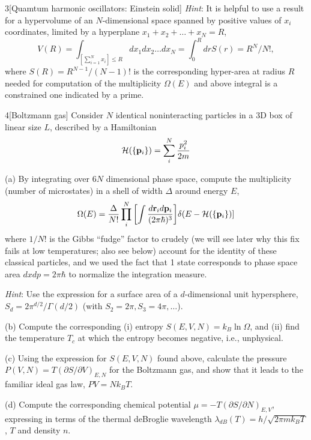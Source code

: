 \documentclass[12pt]{article}
\begin{document}
\begin{problem}{3}[Quamtum harmonic oscillators: Einstein solid]
\textit{Hint}: It is helpful to use a result for a hypervolume of an
$N$-dimensional space spanned by positive values of $x_i$ coordinates, limited
by a hyperplane $x_1+x_2+\hdots+x_N=R$,
\begin{equation}
    V(R)=\int_{[\sum_{i=1}^Nx_i]\leq R}dx_1dx_2\hdots
    dx_N=\int_0^RdrS(r)=R^N/N!,
\end{equation}
where $S(R)=R^{N-1}/(N-1)!$ is the corresponding hyper-area at radius $R$ needed
for computation of the multiplicity $\Omega(E)$ and above integral is a
constrained one indicated by a prime.
\begin{solution}
\end{solution}
\end{problem}
\begin{problem}{4}[Boltzmann gas]
Consider $N$ identical noninteracting particles in a 3D box of linear size $L$,
described by a Hamiltonian
\begin{equation}
    \mathcal{H}(\qty{\vb{p}_i})=\sum_i^N\frac{p_i^2}{2m}
\end{equation}

(a) By integrating over $6N$ dimensional phase space, compute the multiplicity
(number of microstates) in a shell of width $\Delta$ around energy $E$,
\begin{equation}
    \Omega(E)=\frac{\Delta}{N!}\prod_{i}^N\qty[\int\frac{d\vb{r}_id\vb{p}_i}{(2\pi\hbar)^3}]\delta(E-\mathcal{H}(\qty{\vb{p}_i})] 
\end{equation}
where $1/N!$ is the Gibbs ``fudge'' factor to crudely (we will see later why
this fix fails at low temperatures; also see below) account for the identity of
these classical particles, and we used the fact that 1 state corresponds to
phase space area $dxdp=2\pi\hbar$ to normalize the integration measure.

\textit{Hint}: Use the expression for a surface area of a $d$-dimensional unit
hypersphere, $S_d=2\pi^{d/2}/\Gamma(d/2)$ (with $S_2=2\pi,S_3=4\pi,\hdots$).

(b) Compute the corresponding (i) entropy $S(E,V,N)=k_B\ln\Omega$, and (ii) find
the temperature $T_c$ at which the entropy becomes negative, i.e., unphysical.

(c) Using the expression for $S(E,V,N)$ found above, calculate the pressure
$P(V,N)=T(\partial S/\partial V)_{E,N}$ for the Boltzmann gas, and show that it
leads to the familiar ideal gas law, $PV=Nk_BT$.

(d) Compute the corresponding chemical potential $\mu=-T(\partial S/\partial
N)_{E,V}$, expressing in terms of the thermal deBroglie wavelength
$\lambda_{dB}(T)=h/\sqrt{2\pi mk_BT}$, $T$ and density $n$.
\begin{solution}
\end{solution}
\end{problem}
\end{document}
